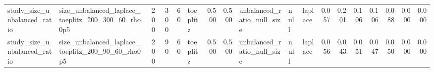 \begin{tabular}{llrrrlrrlllrrrrrrr}
study\_size\_unbalanced\_ratio & size\_unbalanced\_laplace\_toeplitz\_200\_300\_60\_rho0p5 & 200 & 300 & 60 & toeplitz & 0.500 & 0.500 & unbalanced\_ratio\_null\_size & null & laplace & 0.057 & 0.201 & 0.106 & 0.106 & 0.088 & 0.000 & 0.000 \\
study\_size\_unbalanced\_ratio & size\_unbalanced\_laplace\_toeplitz\_200\_90\_60\_rho0p5 & 200 & 90 & 60 & toeplitz & 0.500 & 0.500 & unbalanced\_ratio\_null\_size & null & laplace & 0.056 & 0.043 & 0.051 & 0.047 & 0.050 & 0.000 & 0.000 \\
\bottomrule
\end{tabular}
